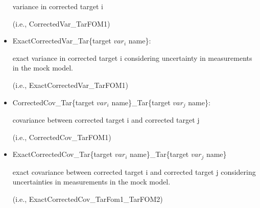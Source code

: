 \begin{itemize}
   variance in corrected target i

   (i.e., CorrectedVar\_TarFOM1)

  \item ExactCorrectedVar\_Tar\{target $var_i$ name\}:

  exact variance in corrected target i considering uncertainty in measurements in the mock model.

  (i.e., ExactCorrectedVar\_TarFOM1)

  \item CorrectedCov\_Tar\{target $var_i$ name\}\_Tar\{target $var_j$ name\}:

  covariance between corrected target i and corrected target j

  (i.e., CorrectedCov\_TarFOM1)

  \item ExactCorrectedCov\_Tar\{target $var_i$ name\}\_Tar\{target $var_j$ name\}

   exact covariance between corrected target i and corrected target j considering uncertainties in measurements in the mock model.

   (i.e., ExactCorrectedCov\_TarFom1\_TarFOM2)


\end{itemize}

